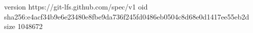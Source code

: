 version https://git-lfs.github.com/spec/v1
oid sha256:e4acf34b9e6e23480e8fbe9da736f245fd0486eb0504c8d68e0d1417ee55eb2d
size 1048672

